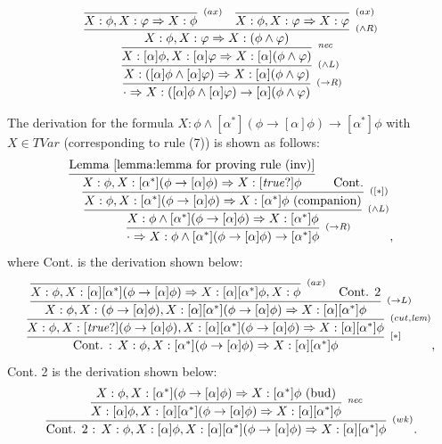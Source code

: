 \documentclass[manuscript,screen]{acmart}
\newcommand{\true}[0]{\mathit{true}}
\newcommand{\lup}[0]{*}
\newcommand{\TVar}[0]{\textit{TVar}}
\newcommand{\Nec}[0]{\textit{nec}}
\begin{document}
$$
\infer[^{(\to R)}]
{\cdot \Rightarrow X : ([\alpha]\phi \wedge [\alpha]\varphi) \to [\alpha](\phi\wedge \varphi)}
{
    \infer[^{(\wedge L)}]
    {X : ([\alpha]\phi \wedge [\alpha]\varphi)\Rightarrow X : [\alpha](\phi\wedge \varphi)}
    {
        \infer[^{\Nec}]
        {X:[\alpha]\phi, X:[\alpha]\varphi\Rightarrow X:[\alpha](\phi\wedge\varphi)}
        {
            \infer[^{(\wedge R)}]
            {X:\phi, X:\varphi\Rightarrow X:(\phi\wedge \varphi)}
            {
                \infer[^{(ax)}]
                {X:\phi, X:\varphi\Rightarrow X:\phi}
                {}
                &
                \infer[^{(ax)}]
                {X:\phi, X:\varphi\Rightarrow X:\varphi}
                {}
            }
        }
    }
}
$$

The derivation for the formula $X : \phi\wedge [\alpha^*](\phi\to [\alpha]\phi)\to [\alpha^*]\phi$ with $X\in \TVar$ (corresponding to rule (7)) is shown as follows: 
$$
\infer[^{(\to R)}]
{\cdot\Rightarrow X : \phi\wedge [\alpha^*](\phi\to [\alpha]\phi)\to [\alpha^*]\phi}
{
    \infer[^{(\wedge L)}]
    {X : \phi\wedge [\alpha^*](\phi\to [\alpha]\phi)\Rightarrow X: [\alpha^*]\phi}
    {
        \infer[^{([\lup])}]
        {X : \phi, X : [\alpha^*](\phi\to [\alpha]\phi)\Rightarrow X: [\alpha^*]\phi \mbox{ (companion)}}
        {
            \infer[]
            {X:\phi, X:[\alpha^*](\phi\to [\alpha]\phi)\Rightarrow X: [\true?]\phi}
            {\mbox{Lemma~\ref{lemma:lemma for proving rule (inv)}}}
            &
            \mbox{Cont.}
        }
    }
},
$$
where Cont. is the derivation shown below: 
$$
\infer[^{[\lup]}]
{\mbox{Cont. : } X:\phi, X:[\alpha^*](\phi\to [\alpha]\phi)\Rightarrow X: [\alpha][\alpha^*]\phi}
{
    \infer[^{(cut, \textit{lem})}]
    {X:\phi, X: [\true?](\phi\to [\alpha]\phi), X:[\alpha][\alpha^*](\phi\to [\alpha]\phi)\Rightarrow X: [\alpha][\alpha^*]\phi}
    {
        \infer[^{(\to L)}]
        {X:\phi, X: (\phi\to [\alpha]\phi), X:[\alpha][\alpha^*](\phi\to [\alpha]\phi)\Rightarrow X: [\alpha][\alpha^*]\phi}
        {
            \infer[^{(ax)}]
            {X : \phi, X : [\alpha][\alpha^*](\phi\to [\alpha]\phi)\Rightarrow X : [\alpha][\alpha^*]\phi, X : \phi}
            {}
            &
            \mbox{Cont. 2}
        }
    }
},
$$
Cont. 2 is the derivation shown below: 
$$
\infer[^{(wk)}]
{\mbox{Cont. 2 : } X : \phi, X : [\alpha]\phi, X : [\alpha][\alpha^*](\phi\to [\alpha]\phi)\Rightarrow X : [\alpha][\alpha^*]\phi}
{
    \infer[^{\Nec}]
    {X : [\alpha]\phi, X : [\alpha][\alpha^*](\phi\to [\alpha]\phi)\Rightarrow X : [\alpha][\alpha^*]\phi}
    {
        X : \phi, X : [\alpha^*](\phi\to [\alpha]\phi)\Rightarrow X : [\alpha^*]\phi \mbox{ (bud)}
    }
}. 
$$
\end{document}
